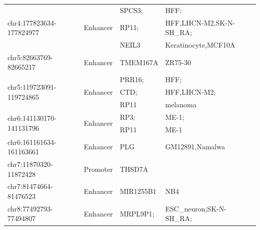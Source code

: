 \begin{table}[]
\begin{tabularx}{\textwidth}{lllX}
    \multirow{3}{*}{chr4:177823634-177824977}  & \multirow{3}{*}{Enhancer}  & SPCS3;      & HFF;                                                                            \\
                                               &                            & RP11;       & HFF,LHCN-M2,SK-N-SH\_RA;                                                        \\
                                               &                            & NEIL3       & Keratinocyte,MCF10A                                                             \\
    chr5:82663769-82665217                     & Enhancer                   & TMEM167A    & ZR75-30                                                                         \\
    \multirow{3}{*}{chr5:119723091-119724865}  & \multirow{3}{*}{Enhancer}  & PRR16;      & HFF;                                                                            \\
                                               &                            & CTD;        & HFF,LHCN-M2;                                                                    \\
                                               &                            & RP11        & melanoma                                                                        \\
    \multirow{2}{*}{chr6:141130170-141131796}  & \multirow{2}{*}{Enhancer}  & RP3;        & ME-1;                                                                           \\
                                               &                            & RP11        & ME-1                                                                            \\
    chr6:161161634-161163661                   & Enhancer                   & PLG         & GM12891,Namalwa                                                                 \\
    chr7:11870320-11872428                     & Promoter                   & THSD7A      &                                                                                 \\
    chr7:81474664-81476523                     & Enhancer                   & MIR1255B1   & NB4                                                                             \\
    \multirow{3}{*}{chr8:77492793-77494807}    & \multirow{3}{*}{Enhancer}  & MRPL9P1;    & ESC\_neuron,SK-N-SH\_RA;                                                        \\

\end{tabularx}
\end{table}
